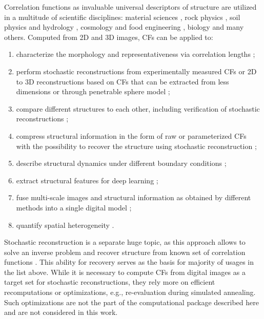 \documentclass[1p]{elsarticle}
\begin{document}
Correlation functions as invaluable universal descriptors of structure are
utilized in a multitude of scientific disciplines: material sciences
\cite{hasanabadi20163d,Havelka,feng2018reconstruction,chen2022quantifying}, rock
physics \cite{ledesma2018effect}, soil physics and hydrology
\cite{PLoS_ONE,KarsaninaEJSS}, cosmology and food engineering
\cite{TakadaJain,Derossi2019}, biology \cite{veatch2012correlation} and many
others. Computed from 2D and 3D images, CFs can be applied to:
\begin{enumerate}
\item characterize the morphology and representativeness via correlation
  lengths \cite{vcapek2009stochastic,thovert2011grain,tensorPRE};
\item perform stochastic reconstructions from experimentally measured CFs
  or 2D to 3D reconstructions based on CFs that can be extracted from less
  dimensions or through penetrable sphere model
  \cite{Adler_recon,Y-T,tahmasebiPRL,hasanabadi20163d,karsaninaPRL};
\item compare different structures to each other, including verification of
  stochastic reconstructions \cite{vcapek2009stochastic,tahmasebiPRL,EPL2};
\item compress structural information in the form of raw or parameterized CFs
  with the possibility to recover the structure using stochastic
  reconstruction \cite{SciRep1,Havelka,KarsaninaEJSS};
\item describe structural dynamics under different boundary conditions
  \cite{chen2015dynamic,xu2022correlation,fomin2023soil};
\item extract structural features for deep learning
  \cite{pilania2017multi,kamrava2020linking,roding2020predicting,KarsaninaEJSS};
\item fuse multi-scale images and structural information as obtained by
  different methods into a single digital model \cite{Geoderma2018};
\item quantify spatial heterogeneity \cite{zhang2000pore,REVpaper}.
\end{enumerate}

Stochastic reconstruction is a separate huge topic, as this approach allows to
solve an inverse problem and recover structure from known set of correlation
functions
\cite{Adler_recon,Y-T,vcapek2009stochastic,hasanabadi20163d,Havelka,feng2018reconstruction,tahmasebiPRL,EPL2,thovert2011grain,tensorPRE}. This
ability for recovery serves as the basis for majority of usages in the list
above. While it is necessary to compute CFs from digital images as a target set
for stochastic reconstructions, they rely more on efficient recomputations or
optimizations, e.g., re-evaluation during simulated annealing. Such
optimizations are not the part of the computational package described here and
are not considered in this work.
\end{document}
